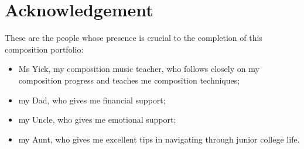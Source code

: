 \documentclass{article}
\begin{document}
\section{Acknowledgement}
These are the people whose presence is crucial to the completion of this composition portfolio:
\begin{itemize}
    \item Ms Yick, my composition music teacher, who follows closely on my composition progress and teaches me composition techniques;
    \item my Dad, who gives me financial support;
    \item my Uncle, who gives me emotional support;
    \item my Aunt, who gives me excellent tips in navigating through junior college life.
\end{itemize}
\end{document}
